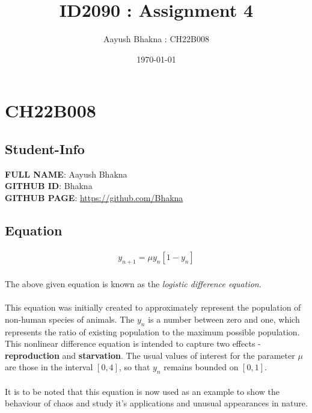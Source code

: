 \documentclass[12pt,pdftex]{article}
\title{ID2090 : Assignment 4}
\author{Aayush Bhakna : CH22B008}
\date{\today}
\begin{document}
	\maketitle
	\thispagestyle{empty}
	\vspace{1cm}
	\section{CH22B008}
	\subsection{Student-Info}
		\textbf{FULL NAME}: Aayush Bhakna \\
		\textbf{GITHUB ID}: Bhakna \\
		\textbf{GITHUB PAGE}: \url{https://github.com/Bhakna} \\
	\subsection{Equation}
		\vspace{0.5cm}
		\begin{align*}
			y_{n+1} = \mu y_n[1 - y_n]
		\end{align*}\\
		The above given equation is known as the \textit{logistic difference equation}\footnotemark. \\\\This equation was initially created to approximately represent the population of non-human species of animals. The $y_n$ is a number between zero and one, which represents the ratio of existing population to the maximum possible population. This nonlinear difference equation is intended to capture two effects -\\ \textbf{reproduction} and \textbf{starvation}. The usual values of interest for the parameter $\mu$ are those in the interval $[0, 4]$, so that $y_n$ remains bounded on $[0, 1]$.\\\\
		It is to be noted that this equation is now used as an example to show the\\ behaviour of chaos and study it's applications and unusual appearances in nature.
		
\end{document}
